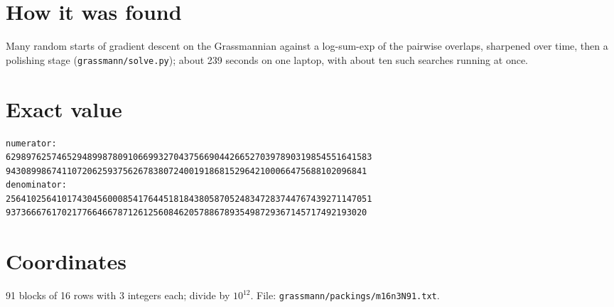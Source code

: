 \documentclass[11pt,a4paper]{article}
\begin{document}
\section{How it was found}
Many random starts of gradient descent on the Grassmannian against a log-sum-exp of the pairwise overlaps, sharpened over time, then a polishing stage (\texttt{grassmann/solve.py}); about 239 seconds on one laptop, with about ten such searches running at once.


\appendix
\section{Exact value}
{\small
\begin{verbatim}
numerator:
629897625746529489987809106699327043756690442665270397890319854551641583
94308998674110720625937562678380724001918681529642100066475688102096841
denominator:
256410256410174304560008541764451818438058705248347283744767439271147051
93736667617021776646678712612560846205788678935498729367145717492193020
\end{verbatim}}

\section{Coordinates}
91 blocks of 16 rows with 3 integers each; divide by $10^{12}$. File: \texttt{grassmann/packings/m16n3N91.txt}.
{\tiny
\begin{multicols}{3}
\end{multicols}}
\end{document}
